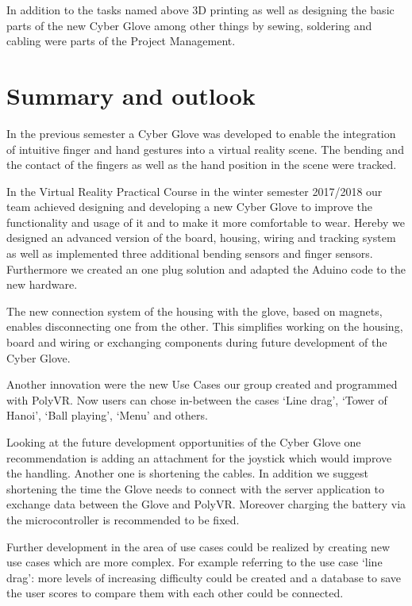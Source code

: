In addition to the tasks named above 3D printing as well as designing the basic parts of the new Cyber Glove among other things by sewing, soldering and cabling were parts of the Project Management.


\section{Summary and outlook}
In the previous semester a Cyber Glove was developed to enable the integration of intuitive finger and hand gestures into a virtual reality scene. The bending and the contact of the fingers as well as the hand position in the scene were tracked. 

In the Virtual Reality Practical Course in the winter semester 2017/2018 our team achieved designing and developing a new Cyber Glove to improve the functionality and usage of it and to make it more comfortable to wear. Hereby we designed an advanced version of the board, housing, wiring and tracking system as well as implemented three additional bending sensors and finger sensors. Furthermore we created an one plug solution and adapted the Aduino code to the new hardware.

The new connection system of the housing with the glove, based on magnets, enables disconnecting one from the other. This simplifies working on the housing, board and wiring or exchanging components during future development of the Cyber Glove.

Another innovation were the new Use Cases our group created and programmed with PolyVR. Now users can chose in-between the cases ‘Line drag’, ‘Tower of Hanoi’, ‘Ball playing’, ‘Menu’ and others.

Looking at the future development opportunities of the Cyber Glove one recommendation is adding an attachment for the joystick which would improve the handling. Another one is shortening the cables. In addition we suggest shortening the time the Glove needs to connect with the server application to exchange data between the Glove and PolyVR. 
Moreover charging the battery via the microcontroller is recommended to be fixed.

Further development in the area of use cases could be realized by creating new use cases which are more complex. For example referring to the use case ‘line drag’: more levels of increasing difficulty could be created and a database to save the user scores to compare them with each other could be connected.
